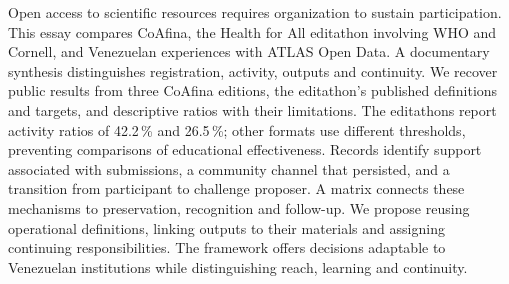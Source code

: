 Open access to scientific resources requires organization to sustain participation. This essay compares CoAfina, the Health for All editathon involving WHO and Cornell, and Venezuelan experiences with ATLAS Open Data. A documentary synthesis distinguishes registration, activity, outputs and continuity. We recover public results from three CoAfina editions, the editathon's published definitions and targets, and descriptive ratios with their limitations. The editathons report activity ratios of 42.2\,\% and 26.5\,\%; other formats use different thresholds, preventing comparisons of educational effectiveness. Records identify support associated with submissions, a community channel that persisted, and a transition from participant to challenge proposer. A matrix connects these mechanisms to preservation, recognition and follow-up. We propose reusing operational definitions, linking outputs to their materials and assigning continuing responsibilities. The framework offers decisions adaptable to Venezuelan institutions while distinguishing reach, learning and continuity.
